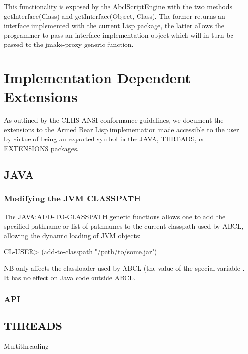 \documentclass[10pt]{book}
\begin{document}
This functionality is exposed by the AbclScriptEngine with the two
methods getInterface(Class) and getInterface(Object, Class). The
former returns an interface implemented with the current Lisp package,
the latter allows the programmer to pass an interface-implementation
object which will in turn be passed to the jmake-proxy generic
function.

\chapter{Implementation Dependent Extensions}

As outlined by the CLHS ANSI conformance guidelines, we document the
extensions to the Armed Bear Lisp implementation made accessible to
the user by virtue of being an exported symbol in the JAVA, THREADS,
or EXTENSIONS packages.

\section{JAVA}

\subsection{Modifying the JVM CLASSPATH}

The JAVA:ADD-TO-CLASSPATH generic functions allows one to add the
specified pathname or list of pathnames to the current classpath
used by ABCL, allowing the dynamic loading of JVM objects:

\begin{listing-lisp}
CL-USER> (add-to-classpath "/path/to/some.jar")
\end{listing-lisp}

NB  only affects the classloader used by ABCL
(the value of the special variable . It has
no effect on Java code outside ABCL.

\subsection{API}



\section{THREADS}

Multithreading
\end{document}

